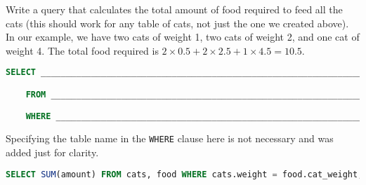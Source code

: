 \begin{parts}
Write a query that calculates the total amount of food required to feed
all the cats (this should work for any table of cats, not just the one we
created above). In our example, we have two cats of weight 1, two cats of
weight 2, and one cat of weight 4. The total food required is $2 \times 0.5 +
2 \times 2.5 + 1 \times 4.5 = 10.5$.
\begin{lstlisting}[language=SQL]
  SELECT _________________________________________________________________________

    FROM _________________________________________________________________________

    WHERE ________________________________________________________________________;
\end{lstlisting}
\begin{solution}
Specifying the table name in the \texttt{WHERE} clause here is not
necessary and was added just for clarity.
\begin{lstlisting}[language=SQL]
SELECT SUM(amount) FROM cats, food WHERE cats.weight = food.cat_weight;
\end{lstlisting}
\end{solution}
\end{parts}
